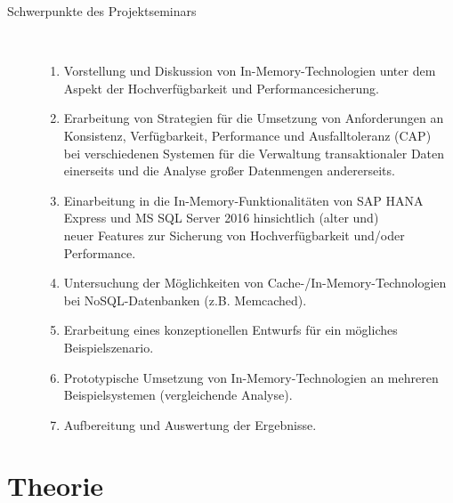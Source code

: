 \documentclass[a4paper, 12pt]{scrartcl}
\begin{document}
\begin{description}
   \item[Schwerpunkte des Projektseminars]~\par
   \begin{enumerate}
      \item Vorstellung und Diskussion von In-Memory-Technologien unter dem Aspekt der Hochverfügbarkeit und Performancesicherung.
      \item Erarbeitung von Strategien für die Umsetzung von Anforderungen an Konsistenz, Verfügbarkeit, Performance und Ausfalltoleranz (CAP)\\ bei verschiedenen Systemen für die Verwaltung transaktionaler Daten einerseits und die Analyse großer Datenmengen andererseits.
      \item Einarbeitung in die In-Memory-Funktionalitäten von SAP HANA Express und MS SQL Server 2016 hinsichtlich (alter und)\\ neuer Features zur Sicherung von Hochverfügbarkeit und/oder Performance.
      \item Untersuchung der Möglichkeiten von Cache-/In-Memory-Technologien\\ bei NoSQL-Datenbanken (z.B. Memcached).
      \item Erarbeitung eines konzeptionellen Entwurfs für ein mögliches Beispielszenario.
      \item Prototypische Umsetzung von In-Memory-Technologien an mehreren Beispielsystemen (vergleichende Analyse).
      \item Aufbereitung und Auswertung der Ergebnisse.
   \end{enumerate}
   
\end{description}
\newpage
\section{Theorie}
\end{document}
